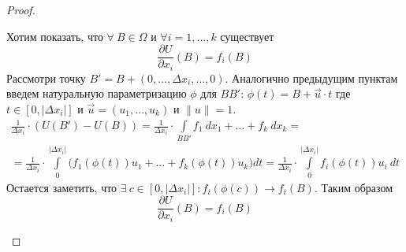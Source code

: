 \begin{proof}
\begin{enumerate}
        Хотим показать, что $\forall\ B\in \Omega$ и $\forall i=1,\dots,k$ существует 
        \[\frac{\partial U}{\partial x_i}(B)=f_i(B)\] 
        Рассмотри точку $B'=B+(0,\dots,\Delta x_i,\dots,0)$. Аналогично предыдущим пунктам  введем натуральную параметризацию $\phi$ для $BB'$:
        $\phi(t)=B+\vec{u}\cdot t$
        где $t\in [0,|\Delta x_i|]$ и $\vec{u}=(u_1,\dots,u_k)$ и $\|u\|=1$.
        \begin{multline*}
            \frac{1}{\Delta x_i}\cdot(U(B')-U(B))=\frac{1}{\Delta x_i}\cdot \int\limits_{BB'}f_1\ dx_1+\dots+f_k\ dx_k=\\
            =\frac{1}{\Delta x_i}\cdot \int\limits_{0}^{|\Delta x_i|}\Big(f_1(\phi(t))u_1+\dots+f_k(\phi(t))u_k\Big) dt=\frac{1}{\Delta x_i}\cdot \int\limits_{0}^{|\Delta x_i|}f_i(\phi(t)) u_i\ dt
        \end{multline*}
        Остается заметить, что $\exists\ c\in [0,|\Delta x_i|]: f_i(\phi(c))\to f_i(B)$. Таким образом
        \[\frac{\partial U}{\partial x_i}(B)=f_i(B)\]
    \end{enumerate}
\end{proof}
